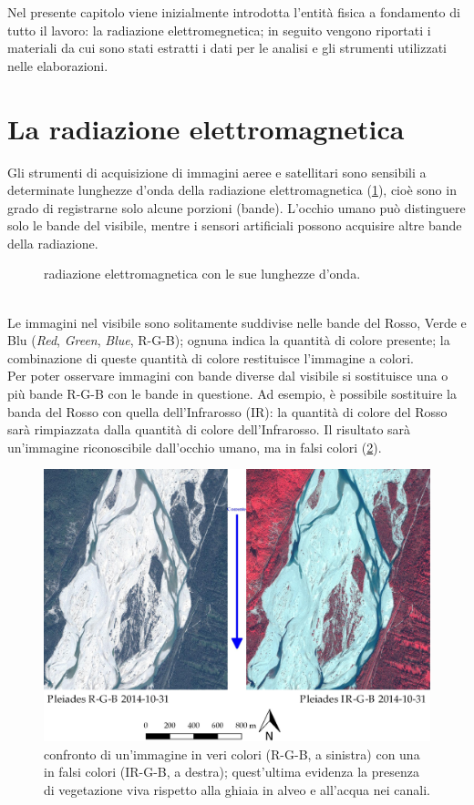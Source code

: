 Nel presente capitolo viene inizialmente introdotta l'entità fisica a fondamento di tutto il lavoro: la radiazione elettromegnetica;
in seguito vengono riportati i materiali da cui sono stati estratti i dati per le analisi e gli strumenti utilizzati nelle elaborazioni.


\section{La radiazione elettromagnetica}
Gli strumenti di acquisizione di immagini aeree e satellitari sono sensibili a determinate lunghezze d'onda della radiazione elettromagnetica (\cref{graph:el-mag-radiation}), cioè sono in grado di registrarne solo alcune porzioni (bande).
L'occhio umano può distinguere solo le bande del visibile, mentre i sensori artificiali possono acquisire altre bande della radiazione.
%
\begin{figure}
	\centering
	
	\caption[radiazione elettromagnetica]{radiazione elettromagnetica con le sue lunghezze d'onda.}
	\label{graph:el-mag-radiation}
\end{figure}
%
\\
Le immagini nel visibile sono solitamente suddivise nelle bande del Rosso, Verde e Blu (\emph{Red}, \emph{Green}, \emph{Blue}, R-G-B); ognuna indica la quantità di colore presente; la combinazione di queste quantità di colore restituisce l'immagine a colori.
\\
Per poter osservare immagini con bande diverse dal visibile si sostituisce una o più bande R-G-B con le bande in questione.
Ad esempio, è possibile sostituire la banda del Rosso con quella dell'Infrarosso (IR): la quantità di colore del Rosso sarà rimpiazzata dalla quantità di colore dell'Infrarosso.
Il risultato sarà un'immagine riconoscibile dall'occhio umano, ma in falsi colori (\cref{fig:confronto-bande-intro}).
%
\begin{figure}
	\centering
	\includegraphics[width=\textwidth]{files/confronto_bande_intro.jpeg}
	\caption[confronto immagini R-G-B e IR-R-G]{confronto di un'immagine in veri colori (R-G-B, a sinistra) con una in falsi colori (IR-G-B, a destra); quest'ultima evidenza la presenza di vegetazione viva rispetto alla ghiaia in alveo e all'acqua nei canali.}
	\label{fig:confronto-bande-intro}
\end{figure}
